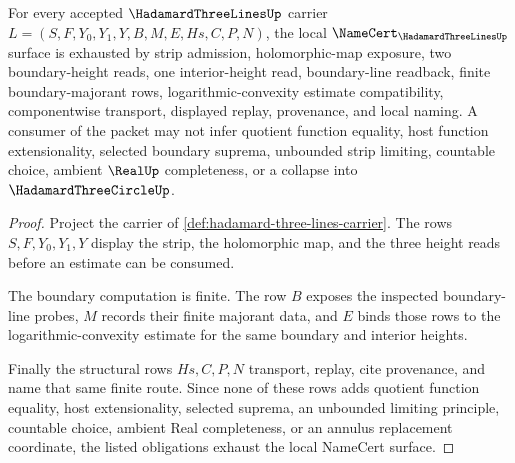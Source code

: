 \begin{theorem}
\label{thm:hadamard-three-lines-namecert-obligations}
For every accepted $\HadamardThreeLinesUp$ carrier $L=(S,F,Y_0,Y_1,Y,B,M,E,Hs,C,P,N)$, the local $\NameCert_{\HadamardThreeLinesUp}$ surface is exhausted by strip admission, holomorphic-map exposure, two boundary-height reads, one interior-height read, boundary-line readback, finite boundary-majorant rows, logarithmic-convexity estimate compatibility, componentwise transport, displayed replay, provenance, and local naming. A consumer of the packet may not infer quotient function equality, host function extensionality, selected boundary suprema, unbounded strip limiting, countable choice, ambient $\RealUp$ completeness, or a collapse into $\HadamardThreeCircleUp$.
\end{theorem}
\begin{proof}
Project the carrier of \autoref{def:hadamard-three-lines-carrier}. The rows $S,F,Y_0,Y_1,Y$ display the strip, the holomorphic map, and the three height reads before an estimate can be consumed.

The boundary computation is finite. The row $B$ exposes the inspected boundary-line probes, $M$ records their finite majorant data, and $E$ binds those rows to the logarithmic-convexity estimate for the same boundary and interior heights.

Finally the structural rows $Hs,C,P,N$ transport, replay, cite provenance, and name that same finite route. Since none of these rows adds quotient function equality, host extensionality, selected suprema, an unbounded limiting principle, countable choice, ambient Real completeness, or an annulus replacement coordinate, the listed obligations exhaust the local NameCert surface.
\end{proof}

